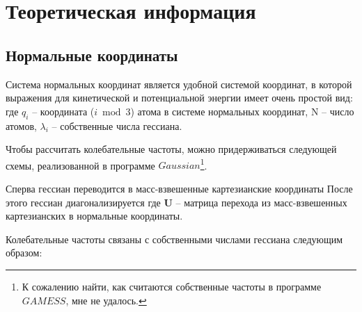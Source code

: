 \section{Теоретическая информация}
\subsection{Нормальные координаты}
Система нормальных координат является удобной системой координат, в которой выражения для кинетической и потенциальной энергии имеет очень простой вид:
где $q_i$ -- координата ($i \bmod 3$) атома в системе нормальных координат, N -- число атомов, $\lambda_i$ -- собственные числа гессиана. 

Чтобы рассчитать колебательные частоты, можно придерживаться следующей схемы, реализованной в программе $Gaussian$\footnote{К сожалению найти, как считаются собственные частоты в программе $GAMESS$, мне не удалось.}.

Сперва гессиан переводится в масс-взвешенные картезианские координаты
После этого гессиан диагонализируется
где \textbf{U} -- матрица перехода из масс-взвешенных картезианских в нормальные координаты.

Колебательные частоты связаны с собственными числами гессиана следующим образом:

